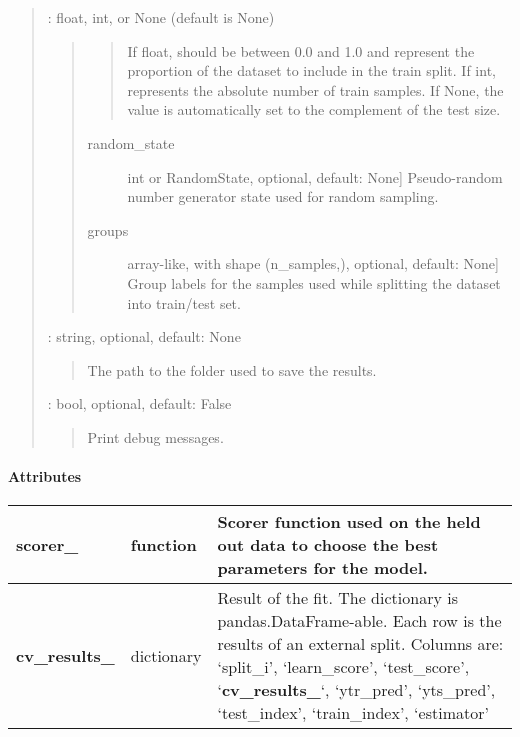 \documentclass[letterpaper,10pt,english]{sphinxmanual}
\begin{document}
\begin{fulllineitems}
\begin{quote}
\begin{description}
 : float, int, or None (default is None)
\begin{quote}
\begin{quote}

If float, should be between 0.0 and 1.0 and represent the
proportion of the dataset to include in the train split. If
int, represents the absolute number of train samples. If None,
the value is automatically set to the complement of the test size.
\end{quote}
\begin{description}
\item[{random\_state}] \leavevmode{[}int or RandomState, optional, default: None{]}
Pseudo-random number generator state used for random sampling.

\item[{groups}] \leavevmode{[}array-like, with shape (n\_samples,), optional, default: None{]}
Group labels for the samples used while splitting the dataset into
train/test set.

\end{description}
\end{quote}

 : string, optional, default: None
\begin{quote}

The path to the folder used to save the results.
\end{quote}

 : bool, optional, default: False
\begin{quote}

Print debug messages.
\end{quote}

\end{description}\end{quote}
\paragraph{Attributes}

\noindent\begin{tabular}{|*{3}{p{}|}}
\hline

{\color{red}\bfseries{}scorer\_}
&
function
&
Scorer function used on the held out data to choose the best
parameters for the model.
\\
\hline
{\color{red}\bfseries{}cv\_results\_}
&
dictionary
&
Result of the fit. The dictionary is pandas.DataFrame-able. Each row is
the results of an external split.
Columns are:
`split\_i', `learn\_score', `test\_score', `{\color{red}\bfseries{}cv\_results\_}`, `ytr\_pred',
`yts\_pred', `test\_index', `train\_index', `estimator'


\end{tabular}
\end{fulllineitems}
\end{document}
